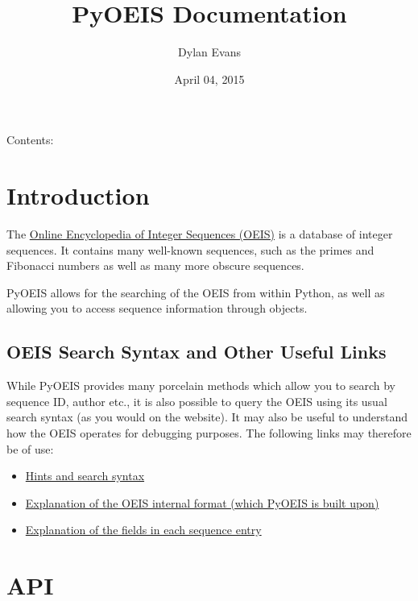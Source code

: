 \documentclass[letterpaper,10pt,english]{sphinxmanual}
\title{PyOEIS Documentation}
\date{April 04, 2015}
\author{Dylan Evans}
\begin{document}
\maketitle
\tableofcontents
{}\label{index::doc}


Contents:


\chapter{Introduction}
\label{introduction:introduction}\label{introduction::doc}\label{introduction:welcome-to-pyoeis-s-documentation}
The \href{http://www.oeis.org}{Online Encyclopedia of Integer Sequences (OEIS)} is
a database of integer sequences. It contains many well-known sequences, such as
the primes and Fibonacci numbers as well as many more obscure sequences.

PyOEIS allows for the searching of the OEIS from within Python, as well as
allowing you to access sequence information through
{\hyperref[api:sequence.Sequence]{\emph{}}} objects.


\section{OEIS Search Syntax and Other Useful Links}
\label{introduction:oeis-search-syntax-and-other-useful-links}
While PyOEIS provides many porcelain methods which allow you to search by
sequence ID, author etc., it is also possible to query the OEIS using its
usual search syntax (as you would on the website). It may also be useful to
understand how the OEIS operates for debugging purposes. The following links
may therefore be of use:
\begin{itemize}
\item {} 
\href{http://oeis.org/hints.html}{Hints and search syntax}

\item {} 
\href{http://oeis.org/eishelp1.html}{Explanation of the OEIS internal format (which PyOEIS is built upon)}

\item {} 
\href{http://oeis.org/eishelp2.html}{Explanation of the fields in each sequence entry}

\end{itemize}


\chapter{API}
\label{api:api}\label{api::doc}
\end{document}
